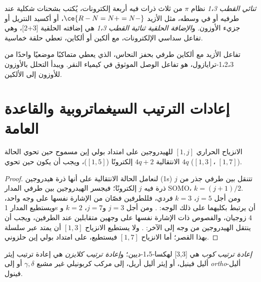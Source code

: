 \begin{definition}\label{def:b3:pericyclic:dipolar}
\emph{ثنائي القطب 1،3} نظام $\pi$ من ثلاث ذرات فيه أربعة
إلكترونات، يُكتب بشحنات شكلية عند طرفيه أو في وسطه، مثل
الأزيد $\ce{R-N=N+=N-}$، أو أكسيد النتريل أو جزيء الأوزون. و\emph{الإضافة الحلقية
ثنائية القطب 1،3} هي إضافته الحلقية [3+2]، وهي
تفاعل سداسي الإلكترونات، مع ألكين أو ألكاين، تعطي حلقة خماسية.
\end{definition}

تفاعل الأزيد مع ألكاين طرفي بحفز النحاس، الذي يعطي متماكبًا موضعيًا واحدًا
من 1،2،3-ترايازول، هو تفاعل الوصل الموثوق في كيمياء
النقر. ويبدأ التحلل بالأوزون  للأوزون إلى
الألكين.

\section{إعادات الترتيب السيغماتروبية والقاعدة العامة}

\begin{proposition}\label{prop:b3:pericyclic:sigmatropic-h}
الانزياح الحراري $[1, j]$ للهيدروجين على امتداد بولي إين مسموح  حين تحوي
الحالة الانتقالية $4q + 2$ إلكترونًا ($[1,5]$)، ويجب أن يكون  حين تحوي $4q$
($[1,3]$، $[1,7]$).
\end{proposition}

\begin{proof}
لنعامل الحالة الانتقالية على أنها ذرة هيدروجين (1s) تتنقل بين طرفي
جذر من $j$ ذرة فيه $j$ إلكترونًا؛ فيجسر الهيدروجين بين طرفي
المدار SOMO، $k = (j + 1)/2$. ومن أجل $j = 5$، $k = 3$ فردي، فللطرفين فصّان من الإشارة نفسها على وجه واحد،
ويستطيع المدار 1s أن يرتبط بكليهما على ذلك الوجه: . ومن أجل $j = 3$ و$j = 7$،
$k = 2$ و$4$ زوجيان، والفصوص ذات الإشارة نفسها على وجهين متقابلين عند الطرفين، 
ويجب أن ينتقل الهيدروجين من وجه إلى الآخر: . ولا يستطيع الانزياح $[1,3]$
أن يمتد عبر سلسلة بهذا القصر؛ أما الانزياح $[1,7]$ فيستطيع، على امتداد بولي إين حلزوني.
\end{proof}

\begin{definition}\label{def:b3:pericyclic:cope-claisen}
\emph{إعادة ترتيب كوب} هي  [3,3]
لهكسا-1،5-ديين؛ و\emph{إعادة ترتيب
كلايزن} هي إعادة ترتيب إيثر أليل فينيل، أو
إيثر أليل أريل، إلى مركب كربونيلي غير مشبع $\gamma,\delta$ أو إلى \textit{ortho}-أليل فينول.
\end{definition}

